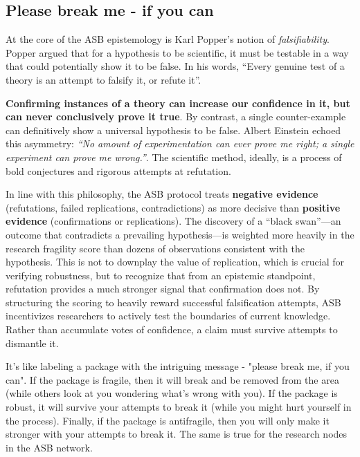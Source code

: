 \documentclass{article}
\begin{document}
\subsection{Please break me - if you can}
At the core of the ASB epistemology is Karl Popper's notion of \emph{falsifiability}\cite{Popper1963}. Popper argued that for a hypothesis to be scientific, it must be testable in a way that could potentially show it to be false. In his words, ``Every genuine test of a theory is an attempt to falsify it, or refute it''\cite{Popper1963}. 

\textbf{Confirming instances of a theory can increase our confidence in it, but can never conclusively prove it true}. By contrast, a single counter-example can definitively show a universal hypothesis to be false. Albert Einstein echoed this asymmetry: \emph{``No amount of experimentation can ever prove me right; a single experiment can prove me wrong.''}. The scientific method, ideally, is a process of bold conjectures and rigorous attempts at refutation.

In line with this philosophy, the ASB protocol treats \textbf{negative evidence} (refutations, failed replications, contradictions) as more decisive than \textbf{positive evidence} (confirmations or replications). The discovery of a ``black swan''---an outcome that contradicts a prevailing hypothesis---is weighted more heavily in the research fragility score than dozens of observations consistent with the hypothesis. This is not to downplay the value of replication, which is crucial for verifying robustness, but to recognize that from an epistemic standpoint, refutation provides a much stronger signal that confirmation does not. 
By structuring the scoring to heavily reward successful falsification attempts, ASB incentivizes researchers to actively test the boundaries of current knowledge. Rather than accumulate votes of confidence, a claim must survive attempts to dismantle it.

It's like labeling a package with the intriguing message - "please break me, if you can". If the package is fragile, then it will break and be removed from the area (while others look at you wondering what's wrong with you). If the package is robust, it will survive your attempts to break it (while you might hurt yourself in the process). Finally, if the package is antifragile, then you will only make it stronger with your attempts to break it. The same is true for the research nodes in the ASB network.
\end{document}
